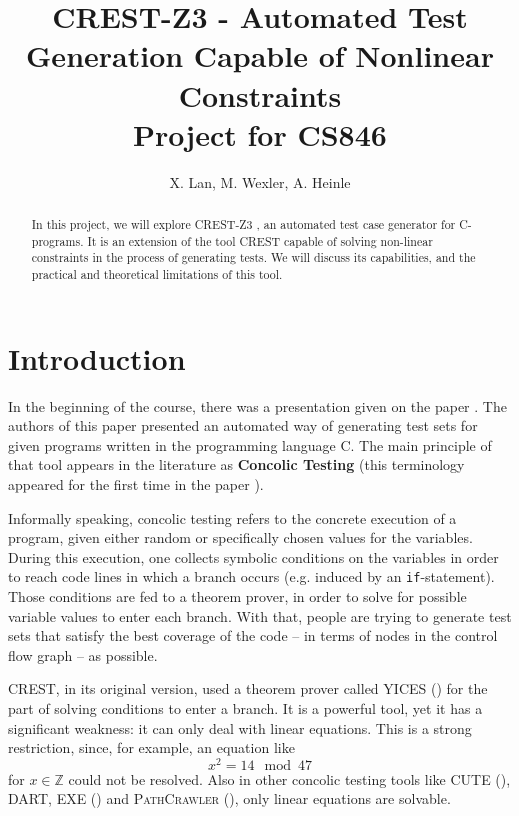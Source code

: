 \documentclass[oribibl, twocolumn]{llncs}
\newcommand{\ZZ}{{\mathbb{Z}}}
\begin{document}
\title{\textsc{CREST-Z3} - Automated Test Generation Capable of Nonlinear Constraints\\[12pt]
Project for CS846}

\author{X. Lan, M. Wexler, A. Heinle}


\maketitle

\begin{abstract}
  In this project, we will explore \textsc{CREST-Z3} \cite{CRESTZ3}, an automated test case generator for C-programs. It is an extension of the tool \textsc{CREST} \cite{CREST} capable of solving non-linear constraints in the process of generating tests. We will discuss its capabilities, and the practical and theoretical limitations of this tool.
\end{abstract}


\section{Introduction}

In the beginning of the course, there was a presentation given on the
paper \cite{godefroid2005dart}. The authors of this paper presented an
automated way of generating test sets for given programs written in
the programming language \textsc{C}. The main principle of that tool
appears in the literature as \textbf{Concolic Testing} (this terminology appeared
for the first time in the paper \cite{sen2005cute}).

Informally speaking, concolic testing refers to the concrete
execution of a program, given either random or specifically chosen
values for the variables. During this execution, one collects symbolic
conditions on the variables in order to reach code lines in which a branch occurs
(e.g. induced by an \texttt{if}-statement). Those conditions are fed
to a theorem prover, in order to solve for possible variable values to
enter each branch. With that, people are trying to generate test sets
that satisfy the best coverage of the code -- in terms of nodes in the
control flow graph -- as possible.

\textsc{CREST}, in its original version, used a theorem prover called
\textsc{YICES} (\cite{dutertre2006yices}) for the part of solving
conditions to enter a branch. It is a powerful tool, yet it has a
significant weakness: it can only deal with linear equations. This is
a strong restriction, since, for example, an equation like
$$x^2 = 14 \mod 47$$
for $x \in \ZZ$ could not be resolved.
Also in other concolic testing tools like \textsc{CUTE}
(\cite{sen2005cute}), \textsc{DART},
\textsc{EXE} (\cite{cadar2008exe}) and \textsc{PathCrawler}
(\cite{williams2005pathcrawler}), only linear equations are solvable.
\end{document}
